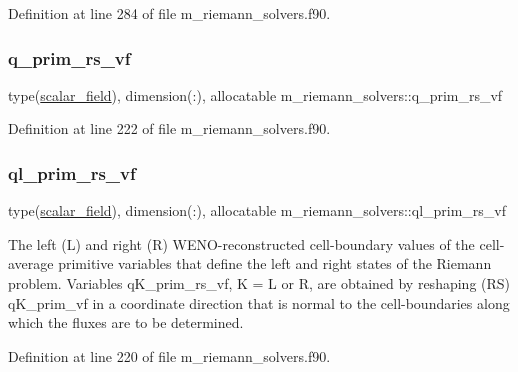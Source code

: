 Definition at line 284 of file m\+\_\+riemann\+\_\+solvers.\+f90.

\mbox{\label{namespacem__riemann__solvers_afe077d6837688601705ac13df3d9c3dc}} 
\subsubsection{\texorpdfstring{q\+\_\+prim\+\_\+rs\+\_\+vf}{q\_prim\_rs\_vf}}
{\footnotesize\ttfamily type(\hyperlink{structm__derived__types_1_1scalar__field}{scalar\+\_\+field}), dimension(\+:), allocatable m\+\_\+riemann\+\_\+solvers\+::q\+\_\+prim\+\_\+rs\+\_\+vf}



Definition at line 222 of file m\+\_\+riemann\+\_\+solvers.\+f90.

\mbox{\label{namespacem__riemann__solvers_aa4fd04af7adfbb38e425f6e91e041ecc}} 
\subsubsection{\texorpdfstring{ql\+\_\+prim\+\_\+rs\+\_\+vf}{ql\_prim\_rs\_vf}}
{\footnotesize\ttfamily type(\hyperlink{structm__derived__types_1_1scalar__field}{scalar\+\_\+field}), dimension(\+:), allocatable m\+\_\+riemann\+\_\+solvers\+::ql\+\_\+prim\+\_\+rs\+\_\+vf}



The left (L) and right (R) W\+E\+N\+O-\/reconstructed cell-\/boundary values of the cell-\/average primitive variables that define the left and right states of the Riemann problem. Variables q\+K\+\_\+prim\+\_\+rs\+\_\+vf, K = L or R, are obtained by reshaping (RS) q\+K\+\_\+prim\+\_\+vf in a coordinate direction that is normal to the cell-\/boundaries along which the fluxes are to be determined. 



Definition at line 220 of file m\+\_\+riemann\+\_\+solvers.\+f90.

